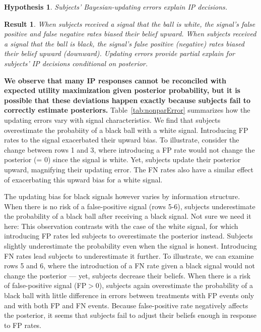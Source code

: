 \documentclass[12pt,a4paper]{article}
\newcommand{\aut}[1]{{\color{Red}#1}}
\newtheorem{hypothesis}{Hypothesis}
\newtheorem{result}{Result}
\begin{document}


\begin{hypothesis} Subjects' Bayesian-updating errors explain IP decisions. \end{hypothesis}
\begin{result} When subjects received a signal that the ball is white, the signal's false positive and false negative rates biased their belief upward. When subjects received a signal that the ball is black, the signal's false positive (negative) rates biased their belief upward (downward). Updating errors provide partial explain for subjects' IP decisions conditional on posterior.\end{result}

\textbf{We observe that many IP responses cannot be reconciled with expected utility maximization given posterior probability, but it is possible that these deviations happen exactly because subjects fail to correctly estimate posteriors.} Table~\ref{tab:nonparError} summarizes how the updating errors vary with signal characteristics. We find that subjects overestimate the probabiity of a black ball with a white signal. Introducing FP rates to the signal exacerbated their upward bias. To illustrate, consider the change between rows 1 and 3, where introducing a FP rate would not change the posterior (= 0) since the signal is white. Yet, subjects update their posterior upward, magnifying their updating error. The FN rates also have a similar effect of exacerbating this upward bias for a white signal.

The updating bias for black signals however varies by information structure. When there is no risk of a false-positive signal (rows 5-6), subjects underestimate the probability of a black ball after receiving a black signal. \aut{Not sure we need it here: This observation contrasts with the case of the white signal, for which introducing FP rates led subjects to overestimate the posterior instead.} Subjects slightly underestimate the probability even when the signal is honest. Introducing FN rates lead subjects to underestimate it further. To illustrate, we can examine rows 5 and 6, where the introduction of a FN rate given a black signal would not change the posterior --- yet, subjects decrease their beliefs. When there is a risk of false-positive signal (FP$>$0), subjects again overestimate the probability of a black ball with little difference in errors between treatments with FP events only and with both FP and FN events. Because false-positive rate negatively affects the posterior, it seems that subjects fail to adjust their beliefs enough in response to FP rates.
\end{document}
